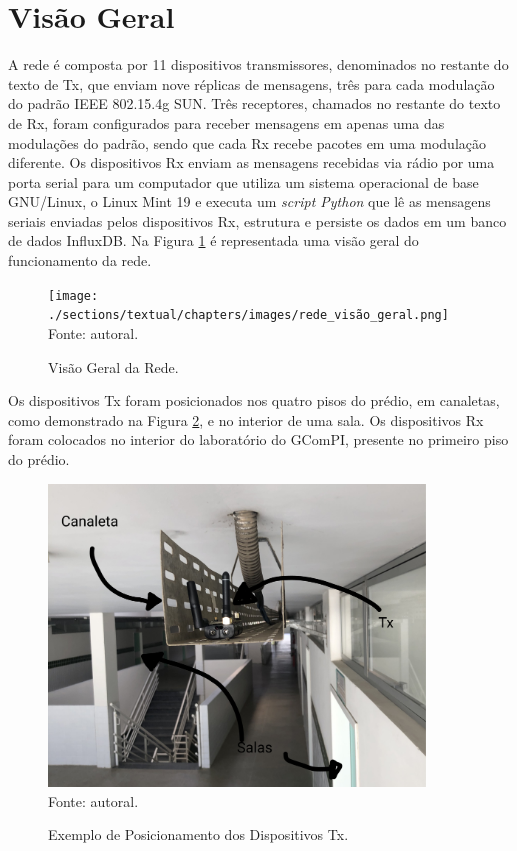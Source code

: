 \section{Visão Geral}
\label{subsec:visaogeral}
A rede é composta por 11 dispositivos transmissores, denominados no restante do texto de Tx, que enviam nove réplicas de mensagens, três para cada modulação do padrão IEEE 802.15.4g SUN. Três receptores, chamados no restante do texto de Rx, foram configurados para receber mensagens em apenas uma das modulações do padrão, sendo que cada Rx recebe pacotes em uma modulação diferente. Os dispositivos Rx enviam as mensagens recebidas via rádio por uma porta serial para um computador que utiliza um sistema operacional de base GNU/Linux, o Linux Mint 19 e executa um \emph{script Python} que lê as mensagens seriais enviadas pelos dispositivos Rx, estrutura e persiste os dados em um banco de dados InfluxDB. Na Figura \ref{fig:rede_visão_geral} é representada uma visão geral do funcionamento da rede.

\begin{figure}[h]
  \begin{center}
    \caption{Visão Geral da Rede.}
    \texttt{[image: ./sections/textual/chapters/images/rede\_visão\_geral.png]}\\
    Fonte: autoral.
    \label{fig:rede_visão_geral}
  \end{center}
\end{figure}

Os dispositivos Tx foram posicionados nos quatro pisos do prédio, em canaletas, como demonstrado na Figura \ref{fig:tx_canaleta}, e no interior de uma sala. Os dispositivos Rx foram colocados no interior do laboratório do GComPI, presente no primeiro piso do prédio.

\begin{figure}[h]
  \begin{center}
    \caption{Exemplo de Posicionamento dos Dispositivos Tx.}
    \includegraphics[width=10cm]{./sections/textual/chapters/images/tx_canaleta.jpg}\\
    Fonte: autoral.
    \label{fig:tx_canaleta}
  \end{center}
\end{figure}

